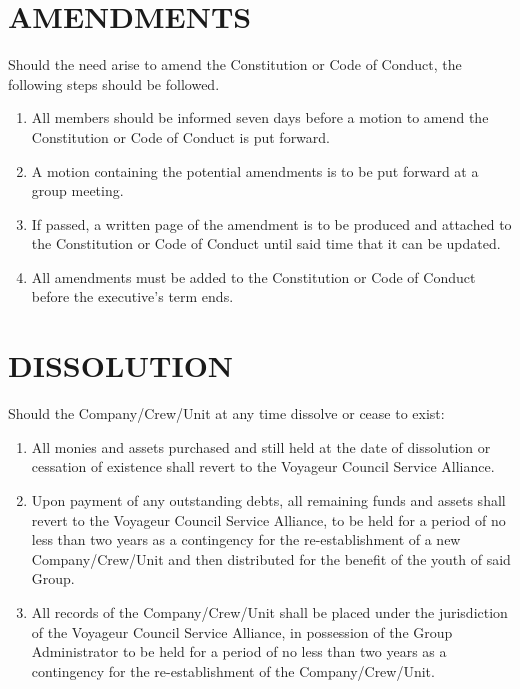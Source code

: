 \documentclass{Service_Corps_Document}
\begin{document}
    \section{AMENDMENTS}
    Should the need arise to amend the Constitution or Code of Conduct, the following steps should be followed. 
    \begin{enumerate}
        \item All members should be informed seven days before a motion to amend the Constitution or Code of Conduct is put forward.
        \item A motion containing the potential amendments is to be put forward at a group meeting.
        \item If passed, a written page of the amendment is to be produced and attached to the Constitution or Code of Conduct until said time that it can be updated.
        \item All amendments must be added to the Constitution or Code of Conduct before the executive’s term ends.
    \end{enumerate}


    \section{DISSOLUTION}
    Should the Company/Crew/Unit at any time dissolve or cease to exist: 
    \begin{enumerate}
        \item All monies and assets purchased and still held at the date of dissolution or cessation of existence shall revert to the Voyageur Council Service Alliance.
        \item Upon payment of any outstanding debts, all remaining funds and assets shall revert to the Voyageur Council Service Alliance, to be held for a period of no less than two years as a contingency for the re-establishment of a new Company/Crew/Unit and then distributed for the benefit of the youth of said Group.
        \item All records of the Company/Crew/Unit shall be placed under the jurisdiction of the Voyageur Council Service Alliance, in possession of the Group Administrator to be held for a period of no less than two years as a contingency for the re-establishment of the Company/Crew/Unit. 
    \end{enumerate}
\end{document}
